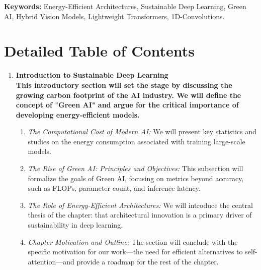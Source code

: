 \documentclass[12pt, a4paper]{article}
\begin{document}
\vspace{0.3cm}

\noindent\textbf{Keywords:} Energy-Efficient Architectures, Sustainable Deep Learning, Green AI, Hybrid Vision Models, Lightweight Transformers, 1D-Convolutions.

\vspace{0.5cm}
\hrulefill %
\vspace{0.5cm}

\section*{Detailed Table of Contents}

\begin{enumerate}
    \item \large\bfseries Introduction to Sustainable Deep Learning \\
    \normalfont This introductory section will set the stage by discussing the growing carbon footprint of the AI industry. We will define the concept of "Green AI" and argue for the critical importance of developing energy-efficient models.
    \begin{enumerate}
        \item \textit{The Computational Cost of Modern AI:} We will present key statistics and studies on the energy consumption associated with training large-scale models.
        \item \textit{The Rise of Green AI: Principles and Objectives:} This subsection will formalize the goals of Green AI, focusing on metrics beyond accuracy, such as FLOPs, parameter count, and inference latency.
        \item \textit{The Role of Energy-Efficient Architectures:} We will introduce the central thesis of the chapter: that architectural innovation is a primary driver of sustainability in deep learning.
        \item \textit{Chapter Motivation and Outline:} The section will conclude with the specific motivation for our work—the need for efficient alternatives to self-attention—and provide a roadmap for the rest of the chapter.
    \end{enumerate}


\end{enumerate}
\end{document}
